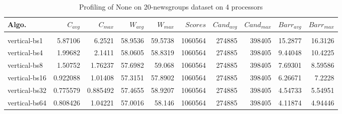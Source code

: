 \begin{table*}[htbp]
\centering
 \begin{tabular}{l r r r r r r r r r}
Algo. & $C_{avg}$ & $C_{max}$ & $W_{avg}$ & $W_{max}$ & $Scores$ & $Cand_{avg}$ & $Cand_{max}$ & $Barr_{avg}$ & $Barr_{max}$ \\
\hline \\
vertical-bs1 & 5.87106 & 6.2521 & 58.9536 & 59.5738 & 1060564 & 274885 & 398405 & 15.2877 & 16.3126 \\
vertical-bs4 & 1.99682 & 2.1411 & 58.0605 & 58.8319 & 1060564 & 274885 & 398405 & 9.44048 & 10.4225 \\
vertical-bs8 & 1.50752 & 1.76237 & 57.6982 & 59.068 & 1060564 & 274885 & 398405 & 7.69301 & 8.59586 \\
vertical-bs16 & 0.922088 & 1.01408 & 57.3151 & 57.8902 & 1060564 & 274885 & 398405 & 6.26671 & 7.2228 \\
vertical-bs32 & 0.775579 & 0.885492 & 57.4655 & 58.9207 & 1060564 & 274885 & 398405 & 4.54733 & 5.54951 \\
vertical-bs64 & 0.808426 & 1.04221 & 57.0016 & 58.146 & 1060564 & 274885 & 398405 & 4.11874 & 4.94446 \\
 
\end{tabular}
\caption{Profiling of None on 20-newsgroups dataset on 4 processors }
\label{tab:20-newsgroups:4}
\end{table*}
